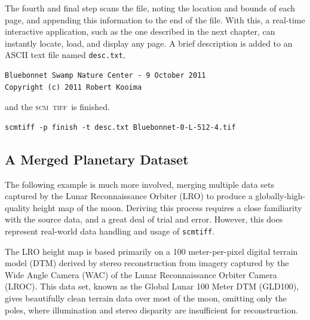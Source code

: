 \documentclass[oneside,10pt]{memoir}
\newcommand{\scm}     {\textsc{scm}}
\newcommand{\tiff}    {\textsc{tiff}}
\newcommand{\scmtiff} {\texttt{scmtiff}}
\begin{document}
\begin{Spacing}{1.1}
The fourth and final step scans the file, noting the location and bounds of each page, and appending this information to the end of the file. With this, a real-time interactive application, such as the one described in the next chapter, can instantly locate, load, and display any page. A brief description is added to an ASCII text file named \texttt{desc.txt},
%
\begin{Verbatim}
Bluebonnet Swamp Nature Center - 9 October 2011
Copyright (c) 2011 Robert Kooima
\end{Verbatim}
%
and the \scm\ \tiff\ is finished.
%
\begin{Verbatim}
scmtiff -p finish -t desc.txt Bluebonnet-0-L-512-4.tif
\end{Verbatim}

\subsection{A Merged Planetary Dataset}
\label{sec:planet}

The following example is much more involved, merging multiple data sets captured by the Lunar Reconnaissance Orbiter (LRO) to produce a globally-high-quality height map of the moon. Deriving this process requires a close familiarity with the source data, and a great deal of trial and error. However, this does represent real-world data handling and usage of \scmtiff.

The LRO height map is based primarily on a 100 meter-per-pixel digital terrain model (DTM) derived by stereo reconstruction from imagery captured by the Wide Angle Camera (WAC) of the Lunar Reconnaissance Orbiter Camera (LROC). This data set, known as the Global Lunar 100 Meter DTM (GLD100), gives beautifully clean terrain data over most of the moon, omitting only the poles, where illumination and stereo disparity are insufficient for reconstruction.


\end{Spacing}
\end{document}
